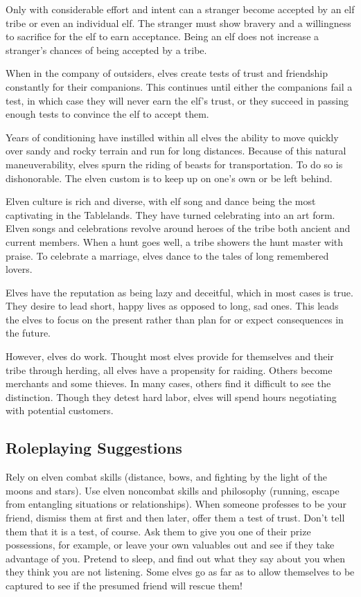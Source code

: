 Only with considerable effort and intent can a stranger become accepted by an elf tribe or even an individual elf. The stranger must show bravery and a willingness to sacrifice for the elf to earn acceptance. Being an elf does not increase a stranger's chances of being accepted by a tribe.

When in the company of outsiders, elves create tests of trust and friendship constantly for their companions. This continues until either the companions fail a test, in which case they will never earn the elf's trust, or they succeed in passing enough tests to convince the elf to accept them.

Years of conditioning have instilled within all elves the ability to move quickly over sandy and rocky terrain and run for long distances. Because of this natural maneuverability, elves spurn the riding of beasts for transportation. To do so is dishonorable. The elven custom is to keep up on one's own or be left behind.

Elven culture is rich and diverse, with elf song and dance being the most captivating in the Tablelands. They have turned celebrating into an art form. Elven songs and celebrations revolve around heroes of the tribe both ancient and current members. When a hunt goes well, a tribe showers the hunt master with praise. To celebrate a marriage, elves dance to the tales of long remembered lovers.

Elves have the reputation as being lazy and deceitful, which in most cases is true. They desire to lead short, happy lives as opposed to long, sad ones. This leads the elves to focus on the present rather than plan for or expect consequences in the future.

However, elves do work. Thought most elves provide for themselves and their tribe through herding, all elves have a propensity for raiding. Others become merchants and some thieves. In many cases, others find it difficult to see the distinction. Though they detest hard labor, elves will spend hours negotiating with potential customers.

\subsection{Roleplaying Suggestions}
Rely on elven combat skills (distance, bows, and fighting by the light of the moons and stars). Use elven noncombat skills and philosophy (running, escape from entangling situations or relationships). When someone professes to be your friend, dismiss them at first and then later, offer them a test of trust. Don't tell them that it is a test, of course. Ask them to give you one of their prize possessions, for example, or leave your own valuables out and see if they take advantage of you. Pretend to sleep, and find out what they say about you when they think you are not listening. Some elves go as far as to allow themselves to be captured to see if the presumed friend will rescue them!

